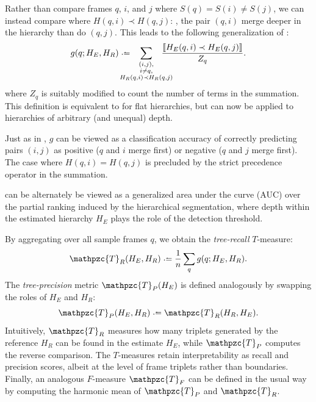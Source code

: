 \documentclass{article}
\def\shag{\ensuremath{\mathpzc{T}}}
\begin{document}
Rather than compare frames $q$, $i$, and $j$ where ${S(q) = S(i) \neq S(j)}$, we can instead compare where
$H(q, i) \prec H(q, j)$: \ie, the pair $(q,i)$ merge deeper in the hierarchy than do $(q,j)$.
This leads to the following generalization of :
\begin{equation}
    g(q ; H_E, H_R) \defeq \hspace{-1.5em} \sum_{\substack{(i, j),\\ i \neq q,\\ H_R(q, i) \prec H_R(q, j)}}
    \hspace{-1.5em} \frac{\ind{H_E(q, i) \prec H_E(q, j)}}{Z_q}.\label{hierrecall}
\end{equation}
where $Z_q$ is suitably modified to count the number of terms in the summation.
This definition is equivalent to  for flat hierarchies, but can now be applied to
hierarchies of arbitrary (and unequal) depth.

Just as in , $g$ can be viewed as a classification accuracy of correctly predicting pairs $(i, j)$ as positive ($q$ and $i$ merge first) or negative ($q$ and $j$ merge first).
The case where $H(q, i) = H(q, j)$ is precluded by the strict precedence operator in the summation.

 can be alternately be viewed as a generalized area under the curve (AUC) over the partial
ranking induced by the hierarchical segmentation, where depth within the estimated hierarchy $H_E$ plays the
role of the detection threshold.

By aggregating over all sample frames $q$, we obtain the \emph{tree-recall} $T$-measure:
\begin{equation}
\shag_R(H_E, H_R) \defeq \frac{1}{n} \sum_q g(q ; H_E, H_R).\label{shagunder}
\end{equation}
The \emph{tree-precision} metric $\shag_P(H_E)$ is defined analogously by swapping the roles of $H_E$ and $H_R$:
\begin{equation}
\shag_P(H_E, H_R) \defeq \shag_R(H_R, H_E).
\end{equation}
Intuitively, $\shag_R$ measures how many triplets generated by the reference $H_R$ can be found in the estimate $H_E$, 
while $\shag_P$ computes the reverse comparison.  The $T$-measures retain interpretability as recall and precision scores,
albeit at the level of frame triplets rather than boundaries.  Finally, an analogous $F$-measure $\shag_F$ can 
be defined in the usual way by computing the harmonic mean of $\shag_P$ and $\shag_R$.
\end{document}
